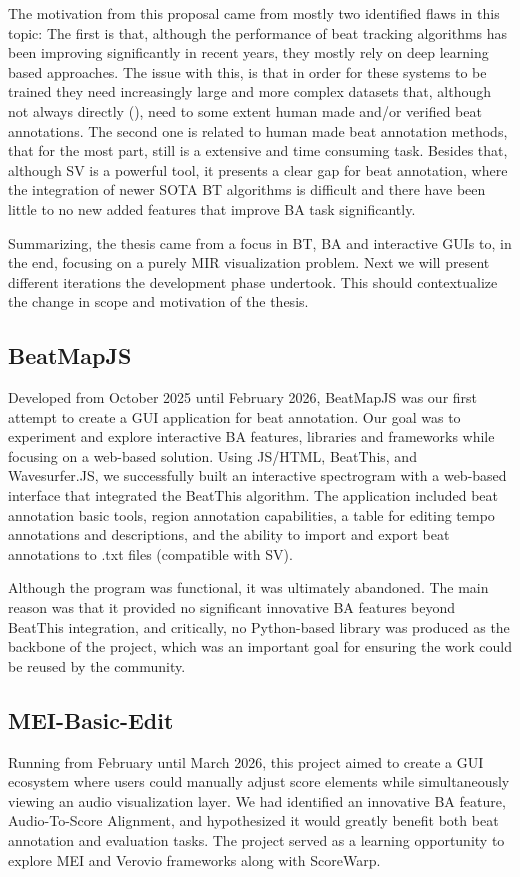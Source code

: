 The motivation from this proposal came from mostly two identified flaws in this topic: The first is that, although the performance of beat tracking algorithms has been improving significantly in recent years, they mostly rely on deep learning based approaches. The issue with this, is that in order for these systems to be trained they need increasingly large and more complex datasets that, although not always directly (\citet{peterAutomaticNoteLevelScoretoPerformance2023}), need to some extent human made and/or verified beat annotations. The second one is related to human made beat annotation methods, that for the most part, still is a extensive and time consuming task. Besides that, although SV is a powerful tool, it presents a clear gap for beat annotation, where the integration of newer SOTA BT algorithms is difficult and there have been little to no new added features that improve BA task significantly.\cite{yamamotoHumanintheLoopAdaptationInteractive2021}

Summarizing, the thesis came from a focus in BT, BA and interactive GUIs to, in the end, focusing on a purely MIR visualization problem. Next we will present different iterations the development phase undertook. This should contextualize the change in scope and motivation of the thesis.

\subsection{BeatMapJS}
Developed from October 2025 until February 2026, BeatMapJS was our first attempt to create a GUI application for beat annotation. Our goal was to experiment and explore interactive BA features, libraries and frameworks while focusing on a web-based solution. Using JS/HTML, BeatThis, and Wavesurfer.JS, we successfully built an interactive spectrogram with a web-based interface that integrated the BeatThis algorithm. The application included beat annotation basic tools, region annotation capabilities, a table for editing tempo annotations and descriptions, and the ability to import and export beat annotations to .txt files (compatible with SV).

Although the program was functional, it was ultimately abandoned. The main reason was that it provided no significant innovative BA features beyond BeatThis integration, and critically, no Python-based library was produced as the backbone of the project, which was an important goal for ensuring the work could be reused by the community.

\subsection{MEI-Basic-Edit}
Running from February until March 2026, this project aimed to create a GUI ecosystem where users could manually adjust score elements while simultaneously viewing an audio visualization layer. We had identified an innovative BA feature, Audio-To-Score Alignment, and hypothesized it would greatly benefit both beat annotation and evaluation tasks. The project served as a learning opportunity to explore MEI and Verovio frameworks along with ScoreWarp.


